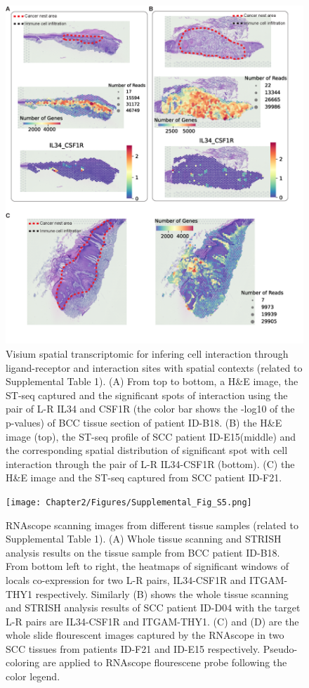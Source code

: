 \begin{figure}[htp]
\renewcommand{\figurename}{Supplementary Figure}
    \centering
    \includegraphics[width=0.75\columnwidth]{Chapter2/Figures/Supplemental_Fig_S4.png}
    \caption{Visium spatial transcriptomic for infering cell interaction through ligand-receptor and interaction sites with spatial contexts (related to Supplemental Table 1). (A) From top to bottom, a H\&E image, the ST-seq captured and the significant spots of interaction using the pair of L-R IL34 and CSF1R (the color bar shows the -log10 of the p-values) of BCC tissue section of patient ID-B18. (B) the H\&E image (top), the ST-seq profile of SCC patient ID-E15(middle) and the corresponding spatial distribution of significant spot with cell interaction through the pair of L-R IL34-CSF1R (bottom). (C) the H\&E image and the ST-seq captured from SCC patient ID-F21. }
    \label{fig:Chap2_Supfigure4}
\end{figure}
\begin{figure}[htp]
\renewcommand{\figurename}{Supplementary Figure}
    \centering
    \texttt{[image: Chapter2/Figures/Supplemental\_Fig\_S5.png]}
    \caption{RNAscope scanning images from different tissue samples (related to Supplemental Table 1). (A) Whole tissue scanning and STRISH analysis results on the tissue sample from BCC patient ID-B18. From bottom left to right, the heatmaps of significant windows of locals co-expression for two L-R pairs, IL34-CSF1R and ITGAM-THY1 respectively. Similarly (B) shows the whole tissue scanning and STRISH analysis results of SCC patient ID-D04 with the target L-R pairs are IL34-CSF1R and ITGAM-THY1. (C) and (D) are the whole slide flourescent images captured by the RNAscope in two SCC tissues from patients ID-F21 and ID-E15 respectively. Pseudo-coloring are applied to RNAscope flourescene probe following the color legend.}
    \label{fig:Chap2_Supfigure5}
\end{figure}
